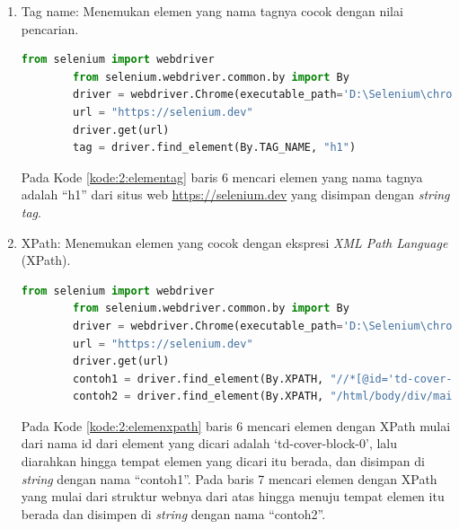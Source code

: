 \begin{enumerate}
	\item Tag name: Menemukan elemen yang nama tagnya cocok dengan nilai pencarian.
	\begin{lstlisting}[language=python, caption=Contoh kode untuk menemukan elemen dengan \textit{tag name}, label=kode:2:elementag]
		from selenium import webdriver
		from selenium.webdriver.common.by import By
		driver = webdriver.Chrome(executable_path='D:\Selenium\chromedriver.exe')
		url = "https://selenium.dev"
		driver.get(url)
		tag = driver.find_element(By.TAG_NAME, "h1")
	\end{lstlisting}
	Pada Kode \ref{kode:2:elementag} baris 6 mencari elemen yang nama tagnya adalah ``h1'' dari situs web \url{https://selenium.dev} yang disimpan dengan \textit{string} \textit{tag}.
	
	\item XPath: Menemukan elemen yang cocok dengan ekspresi \textit{XML Path Language} (XPath).
	\begin{lstlisting}[language=python, caption=Contoh kode untuk menemukan elemen dengan ekspresi XPath, label=kode:2:elemenxpath]
		from selenium import webdriver
		from selenium.webdriver.common.by import By
		driver = webdriver.Chrome(executable_path='D:\Selenium\chromedriver.exe')
		url = "https://selenium.dev"
		driver.get(url)
		contoh1 = driver.find_element(By.XPATH, "//*[@id='td-cover-block-0']/div/div/div/div/h1")
		contoh2 = driver.find_element(By.XPATH, "/html/body/div/main/section[1]/div/div/div/div/h1")
	\end{lstlisting}
	Pada Kode \ref{kode:2:elemenxpath} baris 6 mencari elemen dengan XPath mulai dari nama id dari element yang dicari adalah `td-cover-block-0', lalu diarahkan hingga tempat elemen yang dicari itu berada, dan disimpan di \textit{string} dengan nama ``contoh1''. Pada baris 7 mencari elemen dengan XPath yang mulai dari struktur webnya dari atas hingga menuju tempat elemen itu berada dan disimpen di \textit{string} dengan nama ``contoh2''.

\end{enumerate}

